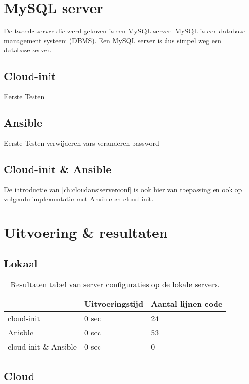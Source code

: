 \section{MySQL server}
De tweede server die werd gekozen is een MySQL server. MySQL is een database management systeem (DBMS). Een MySQL server is dus simpel weg een database server.

\subsection{Cloud-init}
Eerste Testen

\subsection{Ansible}
Eerste Testen
verwijderen vars veranderen password

\subsection{Cloud-init \& Ansible}
De introductie van \ref*{ch:cloudansiserverconf} is ook hier van toepassing en ook op volgende implementatie met Ansible en cloud-init.

\section{Uitvoering \& resultaten}

\subsection{Lokaal}

\begin{table}[!htb]
	\centering
	\begin{tabular}{| l | l | l |}
		\hline
		& \textbf{Uitvoeringstijd} & \textbf{Aantal lijnen code}  \\ \hline
		cloud-init & 0 sec & 24 \\ \hline
		Anisble & 0 sec & 53 \\ \hline
		cloud-init \& Ansible & 0 sec & 0 \\
		\hline
	\end{tabular}
	\caption{Resultaten tabel van server configuraties op de lokale servers.}
	\label{tab:tabel lokale resultaten server}
\end{table}



\subsection{Cloud}

